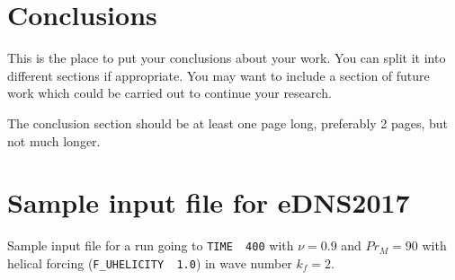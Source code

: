 \documentclass[12pt,a4paper]{report}
\begin{document}
\chapter{Conclusions}

This is the place to put your conclusions about your work. You can
split it into different sections if appropriate. You may want to include
a section of future work which could be carried out to continue your
research.

The conclusion section should be at least one page long, preferably 2
pages, but not much longer.

\appendix
\chapter{Sample input file for eDNS2017}
\label{apx1}

Sample input file for a run going to \texttt{TIME~~400} with $\nu=0.9$ and $Pr_M=90$ with helical forcing (\texttt{F\_UHELICITY~~1.0}) in wave number $k_f=2$.







\end{document}
